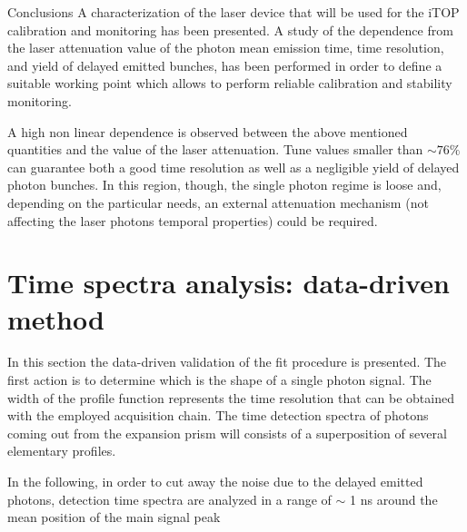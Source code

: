 \documentclass[a4paper,11pt]{article}
\begin{document}
\begin{subsection}{Conclusions}
A characterization of the laser device that will be used for the iTOP calibration and monitoring has been presented.
A study of the dependence from the laser attenuation value of the photon mean emission time, time resolution, and yield of delayed emitted bunches, has been performed in order to define a suitable working point which allows to perform reliable calibration and stability monitoring. 

A high non linear dependence is observed between the above mentioned quantities and the value of the laser attenuation. Tune values smaller than $\sim 76\%$ can guarantee both a good time resolution as well as a negligible yield of delayed photon bunches. In this region, though, the single photon regime is loose and, depending on the particular needs, an external attenuation mechanism (not affecting the laser photons temporal properties) could be required.

\end{subsection}

\section{Time spectra analysis: data-driven method}

In this section the data-driven validation of the fit procedure is presented. The first action is to determine which is the shape of a single photon signal. The width of the profile function represents the time resolution that can be obtained with the employed acquisition chain. The time detection spectra of photons coming out from the expansion prism will consists of a superposition of several elementary profiles. 

In the following, in order to cut away the noise due to the delayed emitted photons, detection time spectra are analyzed in a range of $\sim$ 1 ns around the mean position of the main signal peak
\end{document}
